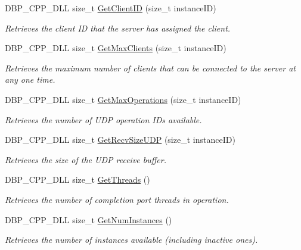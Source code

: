 \begin{DoxyCompactItemize}
DBP\_\-CPP\_\-DLL size\_\-t \hyperlink{namespacemn_a110e66fb2f7eb5b19466874b11cca947}{GetClientID} (size\_\-t instanceID)
\begin{DoxyCompactList}\small\item\em Retrieves the client ID that the server has assigned the client. \item\end{DoxyCompactList}\item 
DBP\_\-CPP\_\-DLL size\_\-t \hyperlink{namespacemn_a74def948c7f024a65f2d645450378ab3}{GetMaxClients} (size\_\-t instanceID)
\begin{DoxyCompactList}\small\item\em Retrieves the maximum number of clients that can be connected to the server at any one time. \item\end{DoxyCompactList}\item 
DBP\_\-CPP\_\-DLL size\_\-t \hyperlink{namespacemn_aa67e3ecf996a52772f41a221cec84579}{GetMaxOperations} (size\_\-t instanceID)
\begin{DoxyCompactList}\small\item\em Retrieves the number of UDP operation IDs available. \item\end{DoxyCompactList}\item 
DBP\_\-CPP\_\-DLL size\_\-t \hyperlink{namespacemn_aa2ad2574ea8e6b8d63111443be1b1bd1}{GetRecvSizeUDP} (size\_\-t instanceID)
\begin{DoxyCompactList}\small\item\em Retrieves the size of the UDP receive buffer. \item\end{DoxyCompactList}\item 
DBP\_\-CPP\_\-DLL size\_\-t \hyperlink{namespacemn_a05bbe5425db98835e70e03845d3ae3f2}{GetThreads} ()
\begin{DoxyCompactList}\small\item\em Retrieves the number of completion port threads in operation. \item\end{DoxyCompactList}\item 
DBP\_\-CPP\_\-DLL size\_\-t \hyperlink{namespacemn_a3132d0d328f9bbdd4fccbd36fc6dff3d}{GetNumInstances} ()
\begin{DoxyCompactList}\small\item\em Retrieves the number of instances available (including inactive ones). \item\end{DoxyCompactList}\item 

\end{DoxyCompactItemize}
